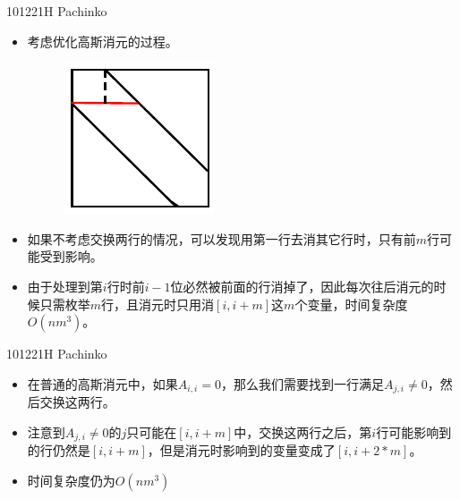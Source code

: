 \documentclass{beamer}
\begin{document}
\begin{frame}{101221H Pachinko}
    \begin{itemize}
        \item 考虑优化高斯消元的过程。
        \begin{figure}
            \includegraphics{1.pdf}
        \end{figure}
        \item 如果不考虑交换两行的情况，可以发现用第一行去消其它行时，只有前$m$行可能受到影响。
        \item 由于处理到第$i$行时前$i-1$位必然被前面的行消掉了，因此每次往后消元的时候只需枚举$m$行，且消元时只用消$[i, i + m]$这$m$个变量，时间复杂度$O(nm^3)$。
    \end{itemize}
\end{frame}

\begin{frame}{101221H Pachinko}
    \begin{itemize}
        \item 在普通的高斯消元中，如果$A_{i,i}=0$，那么我们需要找到一行满足$A_{j,i}\neq 0$，然后交换这两行。
        \item 注意到$A_{j,i}\neq 0$的$j$只可能在$[i, i+m]$中，交换这两行之后，第$i$行可能影响到的行仍然是$[i, i+m]$，但是消元时影响到的变量变成了$[i, i + 2 * m]$。
        \item 时间复杂度仍为$O(nm^3)$
    \end{itemize}
\end{frame}
\end{document}
